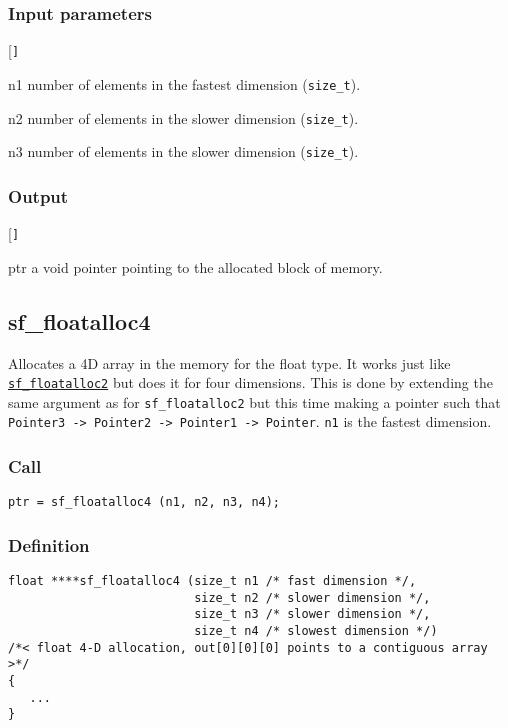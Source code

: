 \subsubsection*{Input parameters}
\begin{desclist}{\tt }{\quad}[\tt ]
   \setlength\itemsep{0pt}
   \item[n1] number of elements in the fastest dimension (\texttt{size\_t}).
   \item[n2] number of elements in the slower dimension (\texttt{size\_t}).
   \item[n3] number of elements in the slower dimension (\texttt{size\_t}).
\end{desclist}

\subsubsection*{Output}
\begin{desclist}{\tt }{\quad}[\tt ]
   \setlength\itemsep{0pt}
   \item[ptr] a void pointer pointing to the allocated block of memory.
\end{desclist}




\subsection{{sf\_floatalloc4}}
Allocates a 4D array in the memory for the float type. It works just like \hyperref[sec:sf_floatalloc2]{\texttt{sf\_floatalloc2}} but does it for four dimensions. This is done by extending the same argument as for \texttt{sf\_floatalloc2} but this time making a pointer such that \texttt{Pointer3 -> Pointer2 -> Pointer1 -> Pointer}. \texttt{n1} is the fastest dimension.

\subsubsection*{Call}
\begin{verbatim}ptr = sf_floatalloc4 (n1, n2, n3, n4);\end{verbatim}

\subsubsection*{Definition}
\begin{verbatim}
float ****sf_floatalloc4 (size_t n1 /* fast dimension */, 
                          size_t n2 /* slower dimension */, 
                          size_t n3 /* slower dimension */, 
                          size_t n4 /* slowest dimension */)
/*< float 4-D allocation, out[0][0][0] points to a contiguous array >*/ 
{
   ...
}
\end{verbatim}

